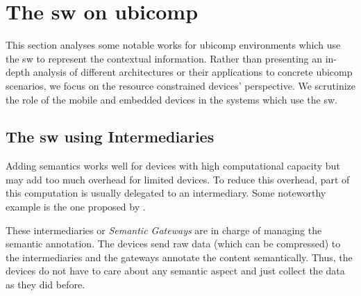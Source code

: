\section{The \acl{sw} on \acs{ubicomp}}
\label{sec:soa_sw_ubicomp}


This section analyses some notable works for \ac{ubicomp} environments which use the \acf{sw} to represent the contextual information.
Rather than presenting an in-depth analysis of different architectures or their applications to concrete \ac{ubicomp} scenarios,
we focus on the resource constrained devices' perspective.
We scrutinize the role of the mobile and embedded devices in the systems which use the \ac{sw}.


\subsection{The \acl{sw} using Intermediaries}
\label{sec:sw_intermediaries}




Adding semantics works well for devices with high computational capacity but may add too much overhead for limited devices.
To reduce this overhead, part of this computation is usually delegated to an intermediary.
Some noteworthy example is the one proposed by \citet{broring_semantic_2009}.






These intermediaries or \emph{Semantic Gateways} are in charge of managing the semantic annotation.
The devices send raw data (which can be compressed) to the intermediaries and the gateways annotate the content semantically.
Thus, the devices do not have to care about any semantic aspect and just collect the data as they did before.

